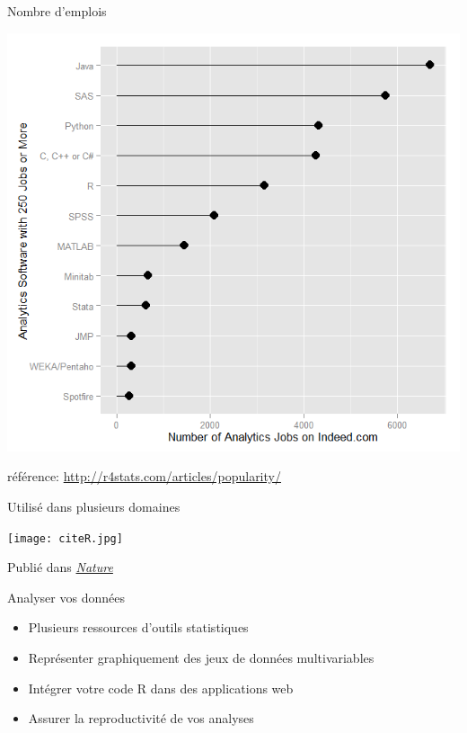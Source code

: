 \documentclass[11pt]{beamer}\usepackage[]{graphicx}\usepackage[]{color}
\begin{document}
\begin{frame}{Nombre d'emplois}

\begin{center}
\includegraphics[scale=0.47]{jobs.png}
\end{center}

\vspace{0.05in}

r\'{e}f\'{e}rence: \href{http://r4stats.com/articles/popularity/}{http://r4stats.com/articles/popularity/}\\

\end{frame}



\begin{frame}{Utilis\'{e} dans plusieurs domaines}

\begin{center}
\texttt{[image: citeR.jpg]}
\end{center}

\vspace{0.05in}

Publi\'{e} dans \href{http://www.nature.com/news/programming-tools-adventures-with-r-1.16609}{\textit{Nature}}
\end{frame}


\begin{frame}{Analyser vos données}
\begin{itemize}
  \setlength\itemsep{2em}
\item Plusieurs ressources d'outils statistiques
\item Représenter graphiquement des jeux de données multivariables
\item Intégrer votre code R dans des applications web
\item Assurer la reproductivité de vos analyses
\end{itemize}
\end{frame}
\end{document}
